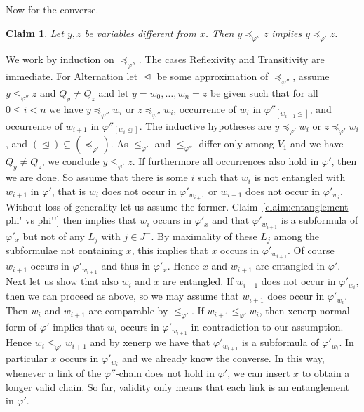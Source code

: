 \documentclass{LMCS}
\newtheorem{clam}{Claim}
\renewcommand{\phi}{\varphi}
\newcommand{\refl}{Reflexivity}
\newcommand{\trans}{Transitivity}
\newcommand{\alt}{Alternation}
\begin{document}
Now for the converse. 

\begin{clam}
Let $y,z$ be variables different from $x$. 
Then $y\preceq_{\phi''}z$ implies $y\preceq_{\phi'}z$. 
\end{clam}

\proof
We work by induction on $\preceq_{\phi''}$. 
The cases \refl{} and \trans{} are immediate. 
For \alt{} let $\trianglelefteq$ be some approximation of $\preceq_{\phi''}$, 
assume $y\leq_{\phi''}z$ and $Q_y\not=Q_z$ 
and let $y=w_0,\ldots,w_n=z$ be given 
such that for all $0\leq i<n$ we have 
$y\preceq_{\phi''}w_i$ or $z\preceq_{\phi''}w_i$, 
occurrence of $w_i$ in $\phi''_{[w_{i+1}\trianglelefteq]}$, 
and occurrence of $w_{i+1}$ in $\phi''_{[w_i\trianglelefteq]}$. 
The inductive hypotheses are 
$y\preceq_{\phi'}w_i$ or $z\preceq_{\phi'}w_i$, 
and $(\trianglelefteq)\subseteq(\preceq_{\phi'})$. 
As $\leq_{\phi'}$ and $\leq_{\phi''}$ differ only among $V_1$ 
and we have $Q_y\not=Q_z$, we conclude $y\leq_{\phi'}z$. 
If furthermore all occurrences also hold in $\phi'$, then we are done. 
So assume that there is some $i$ 
such that $w_i$ is not entangled with $w_{i+1}$ in $\phi'$, 
that is $w_i$ does not occur in $\phi'_{w_{i+1}}$ 
or $w_{i+1}$ does not occur in $\phi'_{w_i}$. 
Without loss of generality let us assume the former. 
Claim~\ref{claim:entanglement phi' vs phi''} then implies 
that $w_i$ occurs in $\phi'_x$ and that $\phi'_{w_{i+1}}$ 
is a subformula of $\phi'_x$ but not of any $L_j$ with $j\in J^-$. 
By maximality of these $L_j$ among the subformulae not containing $x$, 
this implies that $x$ occurs in $\phi'_{w_{i+1}}$. 
Of course $w_{i+1}$ occurs in $\phi'_{w_{i+1}}$ and thus in $\phi'_x$. 
Hence $x$ and $w_{i+1}$ are entangled in $\phi'$. 
Next let us show that also $w_i$ and $x$ are entangled. 
If $w_{i+1}$ does not occur in $\phi'_{w_i}$, then we can proceed as above, 
so we may assume that $w_{i+1}$ does occur in $\phi'_{w_i}$. 
Then $w_i$ and $w_{i+1}$ are comparable by $\leq_{\phi'}$. 
If $w_{i+1}\leq_{\phi'}w_i$, then xenerp normal form of $\phi'$ 
implies that $w_i$ occurs in $\phi'_{w_{i+1}}$ 
in contradiction to our assumption. 
Hence $w_i\leq_{\phi'}w_{i+1}$ 
and by xenerp we have that $\phi'_{w_{i+1}}$ is a subformula of $\phi'_{w_i}$. 
In particular $x$ occurs in $\phi'_{w_i}$ and we already know the converse. 
In this way, whenever a link of the $\phi''$-chain does not hold in $\phi'$, 
we can insert $x$ to obtain a longer valid chain. 
So far, validity only means that each link is an entanglement in $\phi'$. 
\end{document}
